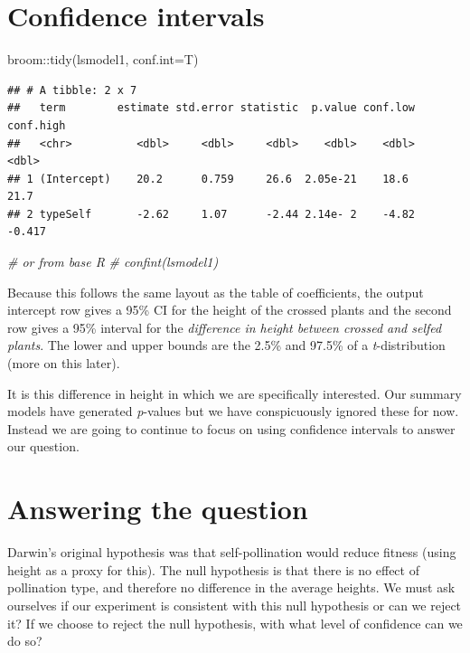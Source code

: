 \documentclass[
]{book}
\newenvironment{Shaded}{\begin{snugshade}}{\end{snugshade}}
\newcommand{\AttributeTok}[1]{\textcolor[rgb]{0.77,0.63,0.00}{#1}}
\newcommand{\CommentTok}[1]{\textcolor[rgb]{0.56,0.35,0.01}{\textit{#1}}}
\newcommand{\FunctionTok}[1]{\textcolor[rgb]{0.00,0.00,0.00}{#1}}
\newcommand{\NormalTok}[1]{#1}
\newcommand{\SpecialCharTok}[1]{\textcolor[rgb]{0.00,0.00,0.00}{#1}}
\begin{document}
\hypertarget{confidence-intervals-1}{%
\section{Confidence intervals}\label{confidence-intervals-1}}

\begin{Shaded}
\begin{Highlighting}[]
\NormalTok{broom}\SpecialCharTok{::}\FunctionTok{tidy}\NormalTok{(lsmodel1, }\AttributeTok{conf.int=}\NormalTok{T)}
\end{Highlighting}
\end{Shaded}

\begin{verbatim}
## # A tibble: 2 x 7
##   term        estimate std.error statistic  p.value conf.low conf.high
##   <chr>          <dbl>     <dbl>     <dbl>    <dbl>    <dbl>     <dbl>
## 1 (Intercept)    20.2      0.759     26.6  2.05e-21    18.6     21.7  
## 2 typeSelf       -2.62     1.07      -2.44 2.14e- 2    -4.82    -0.417
\end{verbatim}

\begin{Shaded}
\begin{Highlighting}[]
\CommentTok{\# or from base R}
\CommentTok{\# confint(lsmodel1)}
\end{Highlighting}
\end{Shaded}

Because this follows the same layout as the table of coefficients, the output intercept row gives a 95\% CI for the height of the crossed plants and the second row gives a 95\% interval for the \emph{difference in height between crossed and selfed plants}. The lower and upper bounds are the 2.5\% and 97.5\% of a \emph{t}-distribution (more on this later).

It is this difference in height in which we are specifically interested. Our summary models have generated \emph{p}-values but we have conspicuously ignored these for now. Instead we are going to continue to focus on using confidence intervals to answer our question.

\hypertarget{answering-the-question}{%
\section{Answering the question}\label{answering-the-question}}

Darwin's original hypothesis was that self-pollination would reduce fitness (using height as a proxy for this). The null hypothesis is that there is no effect of pollination type, and therefore no difference in the average heights.
We must ask ourselves if our experiment is consistent with this null hypothesis or can we reject it? If we choose to reject the null hypothesis, with what level of confidence can we do so?
\end{document}
